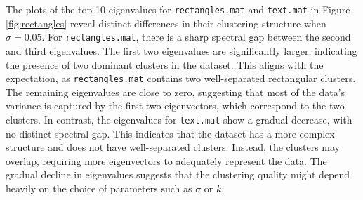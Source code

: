 \documentclass[11pt]{article}
\begin{document}
The plots of the top 10 eigenvalues for \texttt{rectangles.mat} and \texttt{text.mat} in Figure \ref{fig:rectangles} reveal distinct differences in their clustering structure when \(\sigma = 0.05\).
For \texttt{rectangles.mat}, there is a sharp spectral gap between the second and third eigenvalues. The first two eigenvalues are significantly larger, 
indicating the presence of two dominant clusters in the dataset. This aligns with the expectation, as \texttt{rectangles.mat} contains two well-separated rectangular clusters. 
The remaining eigenvalues are close to zero, suggesting that most of the data's variance is captured by the first two eigenvectors, which correspond to the two clusters.
In contrast, the eigenvalues for \texttt{text.mat} show a gradual decrease, with no distinct spectral gap. This indicates that the dataset has a more complex structure and 
does not have well-separated clusters. Instead, the clusters may overlap, requiring more eigenvectors to adequately represent the data. The gradual decline in eigenvalues 
suggests that the clustering quality might depend heavily on the choice of parameters such as \(\sigma\) or \(k\).
\end{document}

